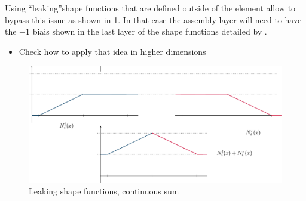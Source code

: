 \documentclass{article}
\begin{document}
Using ``leaking''shape functions that are defined outside of the element \parencite{zhang_hierarchical_2021} allow to bypass this issue as shown in \cref{fig:Continuous}. In that case the assembly layer will need to have the $-1$ biais shown in the last layer of the shape functions detailed by \cite{zhang_hierarchical_2021}.
\begin{itemize}
    \item[\faLightbulb] Check how to apply that idea in higher dimensions
\end{itemize}
\begin{figure}[hbpt]
    \centering
    \includegraphics[width=\linewidth]{Schema/Continuous_sum.pdf}
    \caption{Leaking shape functions, continuous sum}
    \label{fig:Continuous}
\end{figure}

\printbibliography[heading=bibintoc]
\end{document}
